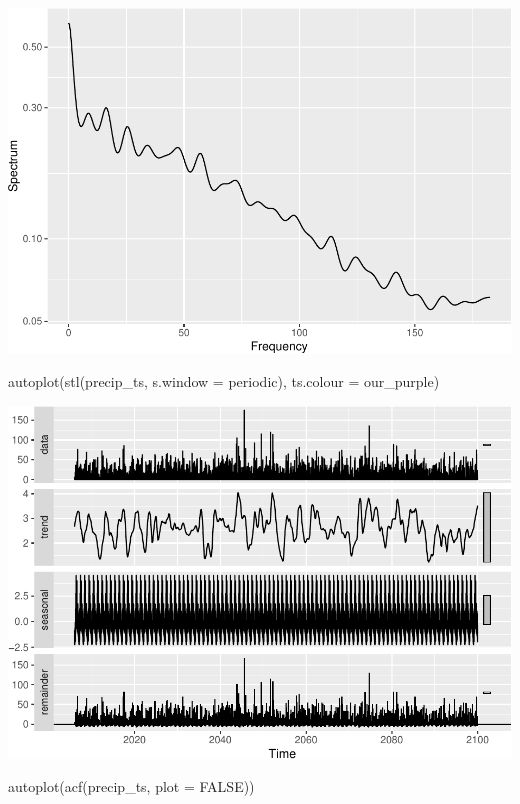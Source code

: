 \documentclass[
  paper=a4,
  ,captions=tableheading
]{scrartcl}
\newenvironment{Shaded}{\begin{snugshade}}{\end{snugshade}}
\newcommand{\AttributeTok}[1]{\textcolor[rgb]{0.77,0.63,0.00}{#1}}
\newcommand{\ConstantTok}[1]{\textcolor[rgb]{0.00,0.00,0.00}{#1}}
\newcommand{\FunctionTok}[1]{\textcolor[rgb]{0.00,0.00,0.00}{#1}}
\newcommand{\NormalTok}[1]{#1}
\newcommand{\StringTok}[1]{\textcolor[rgb]{0.31,0.60,0.02}{#1}}
\begin{document}
\includegraphics{Haskell_files/figure-latex/unnamed-chunk-82-1.pdf}

\begin{Shaded}
\begin{Highlighting}[]
\FunctionTok{autoplot}\NormalTok{(}\FunctionTok{stl}\NormalTok{(precip\_ts, }\AttributeTok{s.window =} \StringTok{\textquotesingle{}periodic\textquotesingle{}}\NormalTok{), }\AttributeTok{ts.colour =}\NormalTok{ our\_purple)}
\end{Highlighting}
\end{Shaded}

\includegraphics{Haskell_files/figure-latex/unnamed-chunk-83-1.pdf}

\begin{Shaded}
\begin{Highlighting}[]
\FunctionTok{autoplot}\NormalTok{(}\FunctionTok{acf}\NormalTok{(precip\_ts, }\AttributeTok{plot =} \ConstantTok{FALSE}\NormalTok{))}
\end{Highlighting}
\end{Shaded}
\end{document}
